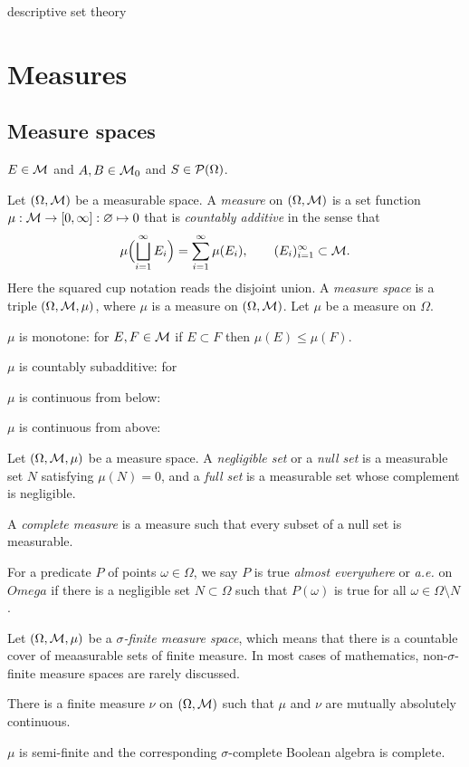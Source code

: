 \documentclass{../../large}
\begin{document}
descriptive set theory




\chapter{Measures}

\section{Measure spaces}

$E\in\mathcal{M}$ and $A,B\in\mathcal{M}_0$ and $S\in\mathcal{P}(\Omega)$.

\begin{prb}
Let $(\Omega,\mathcal{M})$ be a measurable space.
A \emph{measure} on $(\Omega,\mathcal{M})$ is a set function $\mu:\mathcal{M}\to[0,\infty]:\varnothing\mapsto0$ that is \emph{countably additive} in the sense that
\[\mu\Bigl(\bigsqcup_{i=1}^\infty E_i\Bigr)=\sum_{i=1}^\infty\mu(E_i),\qquad(E_i)_{i=1}^\infty\subset\mathcal{M}.\]
Here the squared cup notation reads the disjoint union.
A \emph{measure space} is a triple $(\Omega,\mathcal{M},\mu)$, where $\mu$ is a measure on $(\Omega,\mathcal{M})$.
Let $\mu$ be a measure on $\Omega$.
\begin{parts}
\item $\mu$ is monotone: for $E,F\in\mathcal{M}$ if $E\subset F$ then $\mu(E)\le\mu(F)$.
\item $\mu$ is countably subadditive: for
\item $\mu$ is continuous from below:
\item $\mu$ is continuous from above:
\end{parts}
\end{prb}


\begin{prb}
Let $(\Omega,\mathcal{M},\mu)$ be a measure space.
A \emph{negligible set} or a \emph{null set} is a measurable set $N$ satisfying $\mu(N)=0$, and a \emph{full set} is a measurable set whose complement is negligible.

A \emph{complete measure} is a measure such that every subset of a null set is measurable.

For a predicate $P$ of points $\omega\in\Omega$, we say $P$ is true \emph{almost everywhere} or \emph{a.e.} on $Omega$ if there is a negligible set $N\subset\Omega$ such that $P(\omega)$ is true for all $\omega\in\Omega\setminus N$.
\end{prb}


\begin{prb}
Let $(\Omega,\mathcal{M},\mu)$ be a \emph{$\sigma$-finite measure space}, which means that there is a countable cover of meaasurable sets of finite measure.
In most cases of mathematics, non-$\sigma$-finite measure spaces are rarely discussed.
\begin{parts}
\item There is a finite measure $\nu$ on $(\Omega,\mathcal{M})$ such that $\mu$ and $\nu$ are mutually absolutely continuous.
\item $\mu$ is semi-finite and the corresponding $\sigma$-complete Boolean algebra is complete.
\end{parts}
\end{prb}
\end{document}
